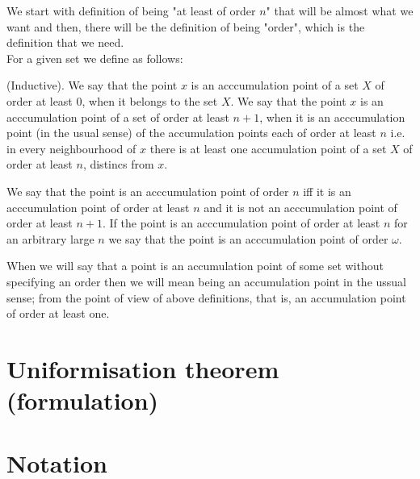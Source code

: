 We start with definition of being "at least of order $n$" that will be almost what we want
and then, there will be the definition of being "order", which is the definition that we need. \\
For a given set we define as follows:
\begin{definition}
(Inductive). 
We say that the point $x$ is an acccumulation point of a set $X$ 
of order at least $0$, when it belongs to the set $X$. 
We say that the point $x$ is an acccumulation point of a set 
of order at least $n + 1$, when it is 
an acccumulation point (in the usual sense) of the accumulation points each of order at least 
$n$ i.e. in every neighbourhood of $x$ there is at least one accumulation point of a set $X$ 
of order at least $n$, distincs from $x$. 
\end{definition}  
\begin{definition}
We say that the point is an acccumulation point of order $n$ iff it is an acccumulation point 
of order at least $n$ and it is not an acccumulation point of order at least $n+1$. 
If the point is an acccumulation point of order at least $n$ for an arbitrary large 
$n$ we say that 
the point is an acccumulation point of order $\omega$.
\end{definition}
When we will say that a point is an accumulation point of some set without specifying an order 
then we will mean being an accumulation point in the ussual sense; from the point of view 
of above definitions, that is, an accumulation point of order at least one.


\section{Uniformisation theorem (formulation)}

\section{Notation}

